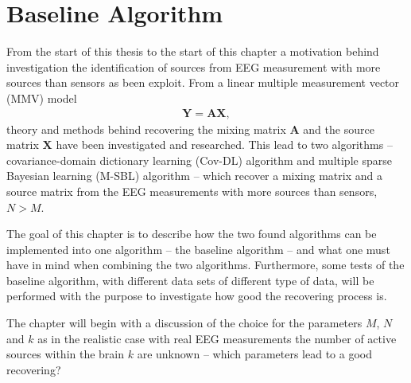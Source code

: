 \chapter{Baseline Algorithm}\label{ch:implementation}
From the start of this thesis to the start of this chapter a motivation behind investigation the identification of sources from EEG measurement with more sources than sensors as been exploit. From a linear multiple measurement vector (MMV) model
\begin{align*}
\mathbf{Y} = \mathbf{AX},
\end{align*}
theory and methods behind recovering the mixing matrix $\mathbf{A}$ and the source matrix $\mathbf{X}$ have been investigated and researched. This lead to two algorithms -- covariance-domain dictionary learning (Cov-DL) algorithm and multiple sparse Bayesian learning (M-SBL) algorithm -- which recover a mixing matrix and a source matrix from the EEG measurements with more sources than sensors, $N > M$.

The goal of this chapter is to describe how the two found algorithms can be implemented into one algorithm -- the baseline algorithm -- and what one must have in mind when combining the two algorithms. Furthermore, some tests of the baseline algorithm, with different data sets of different type of data, will be performed with the purpose to investigate how good the recovering process is. 

The chapter will begin with a discussion of the choice for the parameters $M$, $N$ and $k$ as in the realistic case with real EEG measurements the number of active sources within the brain $k$ are unknown -- which parameters lead to a good recovering?


   







